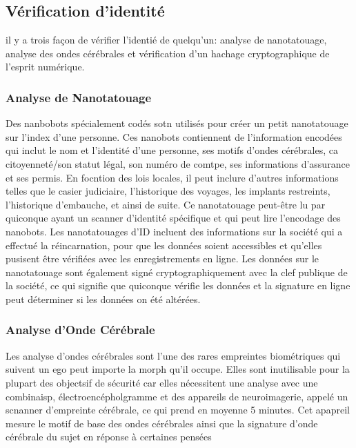\subsection{Vérification d'identité} 

il y a trois façon de vérifier l'identié de quelqu'un: analyse de nanotatouage, analyse des ondes cérébrales et vérification d'un hachage cryptographique de l'esprit numérique. 

\subsubsection{Analyse de Nanotatouage} 

Des nanbobots spécialement codés sotn utilisés pour créer un petit nanotatouage sur l'index d'une personne. Ces nanobots contiennent de l'information encodées qui inclut le nom et l'identité d'une personne, ses motifs d'ondes cérébrales, ca citoyenneté/son statut légal, son numéro de comtpe, ses informations d'assurance et ses permis. En focntion des lois locales, il peut inclure d'autres informations telles que le casier judiciaire, l'historique des voyages, les implants restreints, l'historique d'embauche, et ainsi de suite. Ce nanotatouage peut-être lu par quiconque ayant un scanner d'identité spécifique et qui peut lire l'encodage des nanobots. Les nanotatouages d'ID incluent des informations sur la société qui a effectué la réincarnation, pour que les données soient accessibles et qu'elles pusisent être vérifiées avec les enregistrements en ligne. Les données sur le nanotatouage sont également signé cryptographiquement avec la clef publique de la société, ce qui signifie que quiconque vérifie les données et la signature en ligne peut déterminer si les données on été altérées. 

\subsubsection{Analyse d'Onde Cérébrale} 

Les analyse d'ondes cérébrales sont l'une des rares empreintes biométriques qui suivent un ego peut importe la morph qu'il occupe. Elles sont inutilisable pour la plupart des objectsif de sécurité car elles nécessitent une analyse avec une combinaisp, électroencépholgramme et des appareils de neuroimagerie, appelé un scnanner d'empreinte cérébrale, ce qui prend en moyenne 5 minutes. Cet apapreil mesure le motif de base des ondes cérébrales ainsi que la signature d'onde cérébrale du sujet en réponse à certaines pensées 

